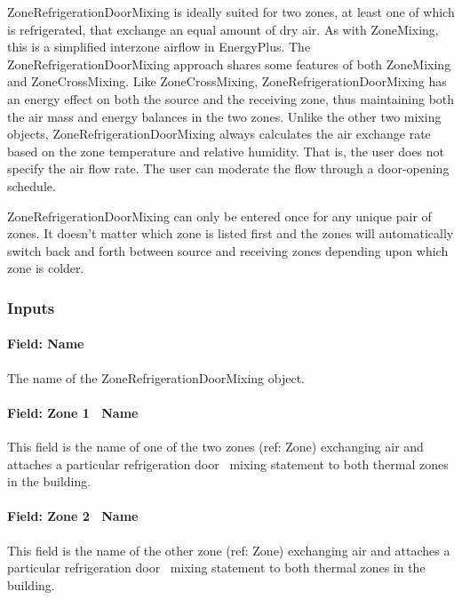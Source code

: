 ZoneRefrigerationDoorMixing is ideally suited for two zones, at least one of which is refrigerated, that exchange an equal amount of dry air. As with ZoneMixing, this is a simplified interzone airflow in EnergyPlus. The ZoneRefrigerationDoorMixing approach shares some features of both ZoneMixing and ZoneCrossMixing. Like ZoneCrossMixing, ZoneRefrigerationDoorMixing has an energy effect on both the source and the receiving zone, thus maintaining both the air mass and energy balances in the two zones. Unlike the other two mixing objects, ZoneRefrigerationDoorMixing always calculates the air exchange rate based on the zone temperature and relative humidity. That is, the user does not specify the air flow rate. The user can moderate the flow through a door-opening schedule.

ZoneRefrigerationDoorMixing can only be entered once for any unique pair of zones. It doesn't matter which zone is listed first and the zones will automatically switch back and forth between source and receiving zones depending upon which zone is colder.

\subsubsection{Inputs}\label{inputs-7-003}

\paragraph{Field: Name}\label{field-name-7-002}

The name of the ZoneRefrigerationDoorMixing object.

\paragraph{Field: Zone 1~ Name}\label{field-zone-1-name}

This field is the name of one of the two zones (ref: Zone) exchanging air and attaches a particular refrigeration door~ mixing statement to both thermal zones in the building.

\paragraph{Field: Zone 2~ Name}\label{field-zone-2-name}

This field is the name of the other zone (ref: Zone) exchanging air and attaches a particular refrigeration door~ mixing statement to both thermal zones in the building.

